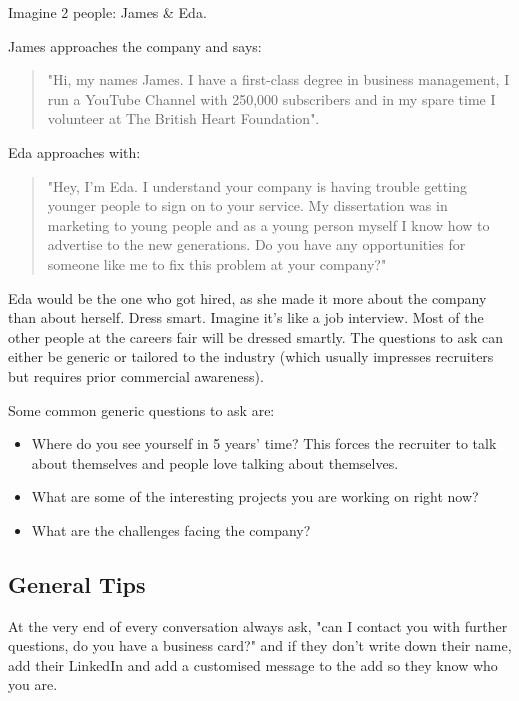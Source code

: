 \documentclass{article}
\begin{document}
Imagine 2 people: James \& Eda.

James approaches the company and says:
\begin{quote}
    "Hi, my names James. I have a first-class degree in business
management, I run a YouTube Channel with 250,000 subscribers and in my
spare time I volunteer at The British Heart Foundation".
\end{quote}
Eda approaches with:
\begin{quote}
    "Hey, I'm Eda. I understand your company is having trouble getting
younger people to sign on to your service. My dissertation was in
marketing to young people and as a young person myself I know how to
advertise to the new generations. Do you have any opportunities for
someone like me to fix this problem at your company?"
\end{quote}
Eda would be the one who got hired, as she made it more about the
company than about herself.
Dress smart. Imagine it's like a job interview. Most of the other people
at the careers fair will be dressed smartly.
The questions to ask can either be generic or tailored to the industry
(which usually impresses recruiters but requires prior commercial
awareness).

Some common generic questions to ask are:

\begin{itemize}
\item
  Where do you see yourself in 5 years' time? This forces the recruiter
  to talk about themselves and people love talking about themselves.
\end{itemize}

\begin{itemize}
\item
  What are some of the interesting projects you are working on right
  now?
\end{itemize}

\begin{itemize}
\item
  What are the challenges facing the company?
\end{itemize}
\subsection{General Tips}
At the very end of every conversation always ask, "can I contact you
with further questions, do you have a business card?" and if they don't
write down their name, add their LinkedIn and add a customised message
to the add so they know who you are.
\end{document}
